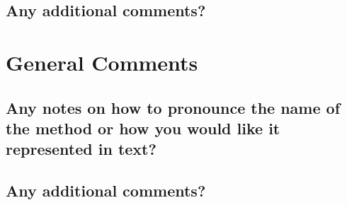 \documentclass[12pt]{article}
\numberwithin{equation}{section}
\begin{document}
\subsection{Any additional comments?}


\section{General Comments}
\subsection{Any notes on how to pronounce the name of the method or how you would like it represented in text?}

\subsection{Any additional comments?}
\end{document}
